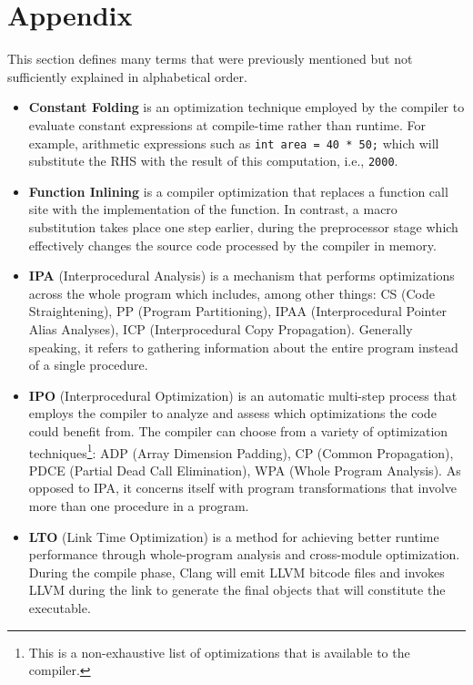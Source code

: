 \section{Appendix}

This section defines many terms that were previously mentioned but not sufficiently
explained in alphabetical order.

\begin{itemize}
    \item \textbf{Constant Folding} is an optimization technique employed by the
    compiler to evaluate constant expressions at compile-time rather than runtime.
    For example, arithmetic expressions such as \texttt{int area = 40 * 50;} which
    will substitute the RHS with the result of this computation, i.e., \texttt{2000}.
    \item \textbf{Function Inlining} is a compiler optimization that replaces a
    function call site with the implementation of the function. In contrast, a
    macro substitution takes place one step earlier, during the preprocessor stage
    which effectively changes the source code processed by the compiler in memory.
    \item \textbf{IPA} (Interprocedural Analysis) is a mechanism that performs
    optimizations across the whole program which includes, among other things: CS
    (Code Straightening), PP (Program Partitioning), IPAA (Interprocedural Pointer
    Alias Analyses), ICP (Interprocedural Copy Propagation). Generally speaking,
    it refers to gathering information about the entire program instead of a single
    procedure.
    \item \textbf{IPO} (Interprocedural Optimization) is an automatic multi-step
    process that employs the compiler to analyze and assess which optimizations
    the code could benefit from. The compiler can choose from a variety of
    optimization techniques\footnote{This is a non-exhaustive list of optimizations
    that is available to the compiler.}: ADP (Array Dimension Padding), CP (Common
    Propagation), PDCE (Partial Dead Call Elimination), WPA (Whole Program Analysis).
    As opposed to IPA, it concerns itself with program transformations that involve
    more than one procedure in a program.
    \item \textbf{LTO} (Link Time Optimization) is a method for achieving better
    runtime performance through whole-program analysis and cross-module optimization.
    During the compile phase, Clang will emit LLVM bitcode files and invokes LLVM
    during the link to generate the final objects that will constitute the executable.

\end{itemize}
